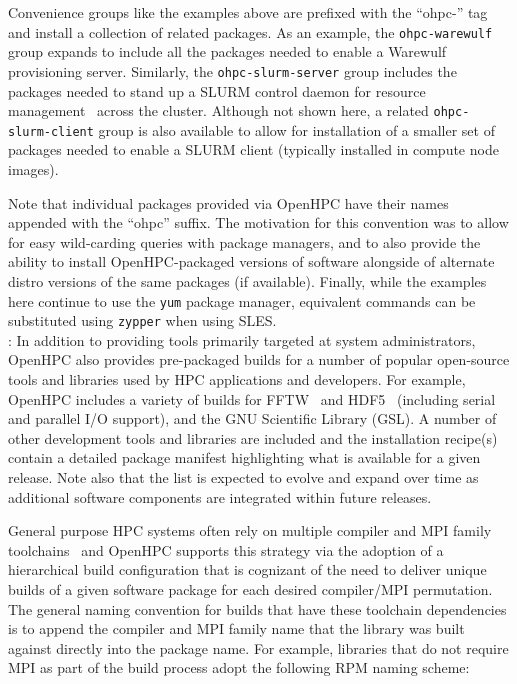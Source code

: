 \documentclass{sig-alternate-05-2015}
\begin{document}
Convenience groups like the examples above are prefixed with the ``ohpc-'' tag
and install a collection of related packages. As an example, the
\texttt{ohpc-warewulf} group expands to include all the packages needed to
enable a Warewulf provisioning server. Similarly, the
\texttt{ohpc-slurm-server} group includes the packages needed to stand up a
SLURM control daemon for resource management~\cite{Jette02slurm:simple} across
the cluster.  Although not shown here, a related \texttt{ohpc-slurm-client}
group is also available to allow for installation of a smaller set of packages
needed to enable a SLURM client (typically installed in compute node images).

Note that individual packages provided via OpenHPC have their names appended
with the ``ohpc'' suffix.  The motivation for this convention was to allow for
easy wild-carding queries with package managers, and to also provide the
ability to install OpenHPC-packaged versions of software alongside of alternate
distro versions of the same packages (if available).  Finally, while the
examples here continue to use the \texttt{yum} package manager, equivalent
commands can be substituted using \texttt{zypper} when using SLES.  \\

: In addition to providing tools primarily
targeted at system administrators, OpenHPC also provides pre-packaged builds
for a number of popular open-source tools and libraries used by HPC
applications and developers. For example, OpenHPC includes a variety of builds
for FFTW~\cite{FFTW05} and HDF5~\cite{hdf5_url} (including serial and
parallel I/O support), and the GNU Scientific Library (GSL). A number of other
development tools and libraries are included and the installation recipe(s)
contain a detailed package manifest highlighting what is available for a given
release. Note also that the list is expected to evolve
and expand over time as additional software components are integrated within
future releases.

General purpose HPC systems often rely on multiple compiler and MPI family
toolchains~\cite{tacc_sc_best_practices:2011} and OpenHPC supports this
strategy via the adoption of a hierarchical build configuration that is
cognizant of the need to deliver unique builds of a given software package for
each desired compiler/MPI permutation.
The general naming convention for builds that have these toolchain dependencies
is to append the compiler and MPI family name that the
library was built against directly into the package name. For example,
libraries that do not require MPI as part of the build process adopt the
following RPM naming scheme: \\
\end{document}
